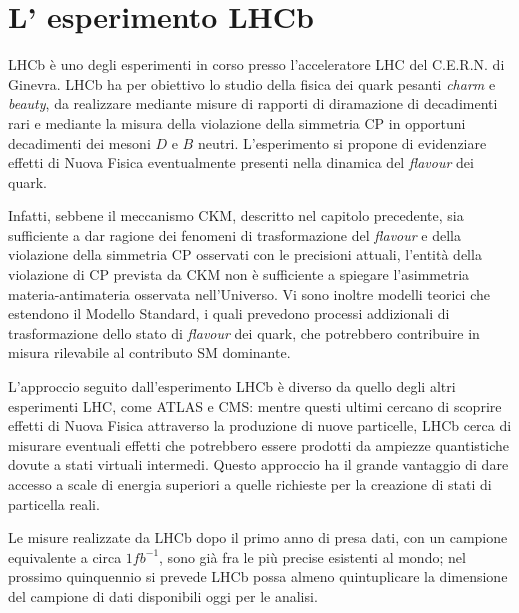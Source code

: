 
\chapter{L' esperimento LHCb}
\noindent
LHCb \`e uno degli esperimenti in corso presso l'acceleratore LHC  del  C.E.R.N. di Ginevra. LHCb ha per obiettivo lo studio della fisica dei quark pesanti \emph{charm} e \emph{beauty}, da realizzare mediante misure di rapporti di diramazione di decadimenti rari e mediante la misura della violazione della simmetria CP in opportuni decadimenti dei mesoni $D$ e $B$ neutri. L'esperimento si propone di evidenziare effetti di Nuova Fisica eventualmente presenti nella dinamica del \emph{flavour} dei quark.

Infatti, sebbene il  meccanismo CKM, descritto nel capitolo precedente, sia sufficiente a dar ragione dei fenomeni di trasformazione del \emph{flavour} e della violazione della simmetria CP osservati con le precisioni attuali, l'entit\`a della violazione di CP prevista da CKM non \`e sufficiente a spiegare l'asimmetria materia-antimateria osservata nell'Universo. Vi sono inoltre modelli teorici che estendono il Modello Standard, i quali prevedono processi addizionali di trasformazione dello stato di \emph{flavour} dei quark, che potrebbero contribuire in misura rilevabile al contributo SM dominante.

L'approccio seguito dall'esperimento LHCb \`e diverso da quello degli altri esperimenti LHC, come ATLAS e CMS: mentre questi ultimi cercano di scoprire effetti di Nuova Fisica attraverso la produzione di nuove particelle, LHCb cerca di misurare eventuali effetti che potrebbero essere prodotti da ampiezze quantistiche dovute a stati virtuali intermedi. Questo approccio ha il grande vantaggio di dare accesso a scale di energia superiori a quelle  richieste per la creazione di stati di particella reali.

Le misure realizzate da LHCb dopo il primo anno di presa dati, con un campione equivalente a circa $1 fb^{-1}$,  sono gi\`a fra le pi\`u precise esistenti al mondo; nel prossimo quinquennio si prevede LHCb possa almeno quintuplicare la dimensione del campione di dati disponibili oggi per le analisi.
 
